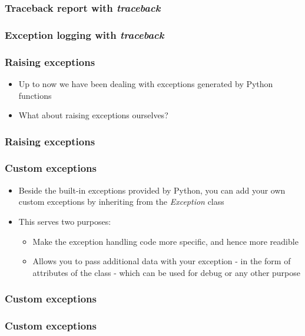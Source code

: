 \documentclass[9pt]{beamer}
\begin{document}
\begin{frame}
  \frametitle{Traceback report with \emph{traceback}}
  
\end{frame}


\begin{frame}
  \frametitle{Exception logging with \emph{traceback}}
  
\end{frame}


\begin{frame}
  \frametitle{Raising exceptions}
  \begin{itemize}
    \item Up to now we have been dealing with exceptions generated by Python
          functions
    \medskip
    \item What about raising exceptions ourselves?
  \end{itemize}
\end{frame}


\begin{frame}
  \frametitle{Raising exceptions}
  
\end{frame}


\begin{frame}
  \frametitle{Custom exceptions}
  \begin{itemize}
    \item Beside the built-in exceptions provided by Python, you can add your
          own custom exceptions by inheriting from the \emph{Exception} class
    \medskip
    \item This serves two purposes:
    \begin{itemize}
      \item Make the exception handling code more specific, and hence more
            readible
      \item Allows you to pass additional data with your exception - in the
            form of attributes of the class - which can be used for debug
            or any other purpose
    \end{itemize}
  \end{itemize}
\end{frame}


\begin{frame}
  \frametitle{Custom exceptions}
  
\end{frame}


\begin{frame}
  \frametitle{Custom exceptions}
  
\end{frame}
\end{document}
